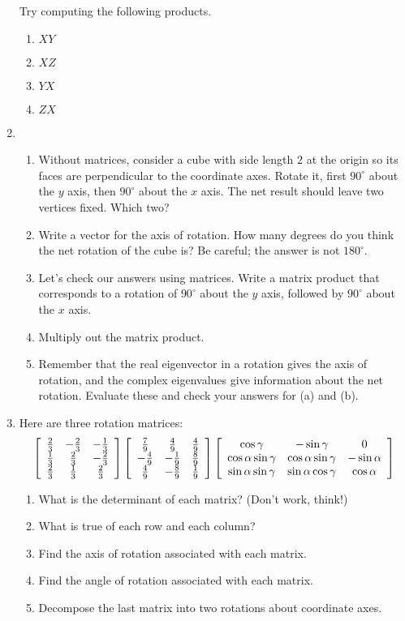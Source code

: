\documentclass[../gatm.tex]{subfiles}
\begin{document}
\begin{enumerate}
Try computing the following products.
\begin{multicols}{4}
\begin{enumerate}
\item $XY$
\item $XZ$
\item $YX$
\item $ZX$
\end{enumerate}
\end{multicols}
\item \begin{enumerate}
\item Without matrices, consider a cube with side length $2$ at the origin so its faces are perpendicular to the coordinate axes. Rotate it, first $90^\circ$ about the $y$ axis, then $90^\circ$ about the $x$ axis. The net result should leave two vertices fixed. Which two?
\item Write a vector for the axis of rotation. How many degrees do you think the net rotation of the cube is? Be careful; the answer is not $180^\circ$.
\item Let's check our answers using matrices. Write a matrix product that corresponds to a rotation of $90^\circ$ about the $y$ axis, followed by $90^\circ$ about the $x$ axis.
\item Multiply out the matrix product.
\item Remember that the real eigenvector in a rotation gives the axis of rotation, and the complex eigenvalues give information about the net rotation. Evaluate these and check your answers for (a) and (b).
\end{enumerate}
\item Here are three rotation matrices:
$$\left[\begin{array}{ccc} \frac{2}{3} & -\frac{2}{3} & -\frac{1}{3} \\ \frac{1}{3} & \frac{2}{3} & -\frac{2}{3} \\ \frac{2}{3} & \frac{1}{3} & \frac{2}{3} \end{array}\right]
\left[\begin{array}{ccc} \frac{7}{9} & \frac{4}{9} & \frac{4}{9} \\ -\frac{4}{9} & -\frac{1}{9} & \frac{8}{9} \\ \frac{4}{9} & -\frac{8}{9} & \frac{1}{9} \end{array}\right]
\left[\begin{array}{ccc} \cos\gamma & -\sin\gamma & 0 \\ \cos\alpha\sin\gamma & \cos\alpha\sin\gamma & -\sin\alpha \\ \sin\alpha\sin\gamma & \sin\alpha\cos\gamma & \cos\alpha \end{array}\right]$$
\begin{enumerate}
\item What is the determinant of each matrix? (Don't work, think!)
\item What is true of each row and each column?
\item Find the axis of rotation associated with each matrix.
\item Find the angle of rotation associated with each matrix.
\item Decompose the last matrix into two rotations about coordinate axes.
\end{enumerate}
\end{enumerate}
\end{document}
